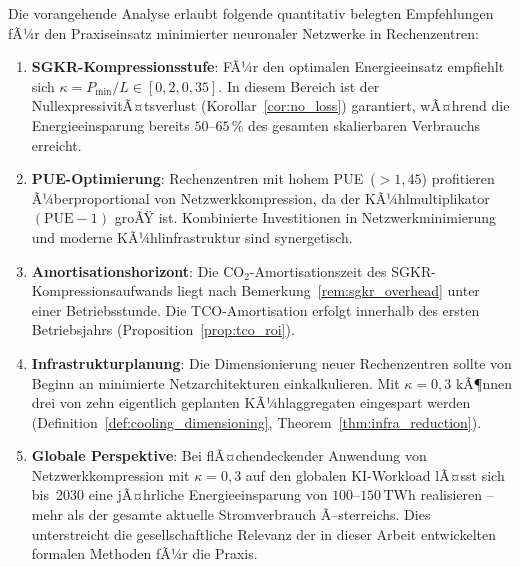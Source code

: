 ﻿\documentclass[12pt, a4paper, openany]{report}
\begin{document}
Die vorangehende Analyse erlaubt folgende quantitativ belegten Empfehlungen
fÃ¼r den Praxiseinsatz minimierter neuronaler Netzwerke in Rechenzentren:

\begin{enumerate}[label=(\arabic*)]
  \item \textbf{SGKR-Kompressionsstufe}: FÃ¼r den optimalen
    Energieeinsatz empfiehlt sich $\kappa = P_{\min}/L \in [0{,}2, 0{,}35]$.
    In diesem Bereich ist der NullexpressivitÃ¤tsverlust (Korollar~\ref{cor:no_loss})
    garantiert, wÃ¤hrend die Energieeinsparung bereits $50$--$65\,\%$ des
    gesamten skalierbaren Verbrauchs erreicht.

  \item \textbf{PUE-Optimierung}: Rechenzentren mit hohem PUE~($>1{,}45$)
    profitieren Ã¼berproportional von Netzwerkkompression, da der
    KÃ¼hlmultiplikator $(\mathrm{PUE}-1)$ groÃŸ ist.  Kombinierte
    Investitionen in Netzwerkminimierung und moderne KÃ¼hlinfrastruktur
    sind synergetisch.

  \item \textbf{Amortisationshorizont}: Die CO$_2$-Amortisa\-tionszeit
    des SGKR-Kompressions\-aufwands liegt nach
    Bemerkung~\ref{rem:sgkr_overhead} unter einer Betriebsstunde.
    Die TCO-Amortisa\-tion erfolgt innerhalb des ersten Betriebsjahrs
    (Proposition~\ref{prop:tco_roi}).

  \item \textbf{Infrastrukturplanung}: Die Dimensionierung neuer
    Rechenzentren sollte von Beginn an minimierte Netzarchitekturen
    einkalkulieren.  Mit $\kappa = 0{,}3$ kÃ¶nnen drei von zehn
    eigentlich geplanten KÃ¼hlaggregaten eingespart werden
    (Definition~\ref{def:cooling_dimensioning}, Theorem~\ref{thm:infra_reduction}).

  \item \textbf{Globale Perspektive}: Bei flÃ¤chendeckender Anwendung von
    Netzwerkkompression mit $\kappa = 0{,}3$ auf den globalen KI-Workload
    lÃ¤sst sich bis~2030 eine jÃ¤hrliche Energieeinsparung von
    $100$--$150\,\mathrm{TWh}$ realisieren -- mehr als der gesamte aktuelle
    Stromverbrauch Ã–sterreichs.  Dies unterstreicht die gesellschaftliche
    Relevanz der in dieser Arbeit entwickelten formalen Methoden fÃ¼r die
    Praxis.
\end{enumerate}

\end{document}
